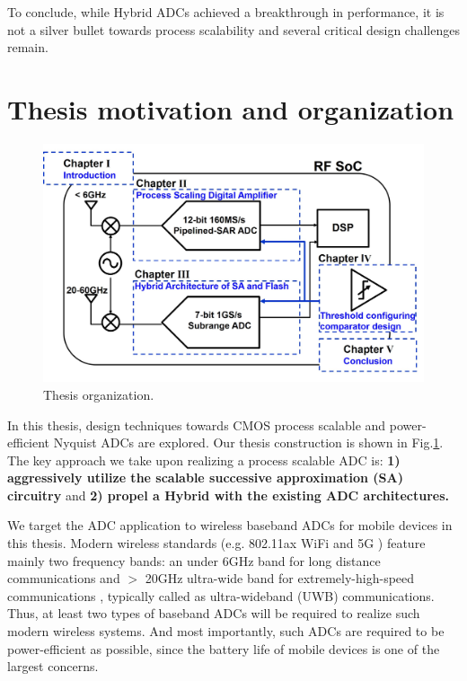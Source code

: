 To conclude, while Hybrid ADCs achieved a breakthrough in performance, it is not a silver bullet towards process scalability and several critical design challenges remain.

\section{Thesis motivation and organization}

\begin{figure}[!]
\centering
  \includegraphics[width=1\textwidth]{figure/chap1/thesis-org.jpg}
  \caption{Thesis organization.}
  \label{thesis-top}
\end{figure}

In this thesis, design techniques towards CMOS process scalable and power-efficient Nyquist ADCs are explored. 
Our thesis construction is shown in Fig.\ref{thesis-top}.
The key approach we take upon realizing a process scalable ADC is: \textbf{1) aggressively utilize the scalable successive approximation (SA) circuitry} and \textbf{2) propel a Hybrid with the existing ADC architectures.}
 
We target the ADC application to wireless baseband ADCs for mobile devices in this thesis.
Modern wireless standards  (e.g. 802.11ax WiFi \cite{11ax} and 5G \cite{andrews2014will}) feature mainly two frequency bands: an under 6GHz band for long distance communications and $>$ 20GHz ultra-wide band for extremely-high-speed communications \cite{802.11ad} \cite{rappaport2013millimeter}, typically called as ultra-wideband (UWB) communications.
Thus, at least two types of baseband ADCs will be required to realize such modern wireless systems. And most importantly, such ADCs are required to be power-efficient as possible, since the battery life of mobile devices is one of the largest concerns. 

